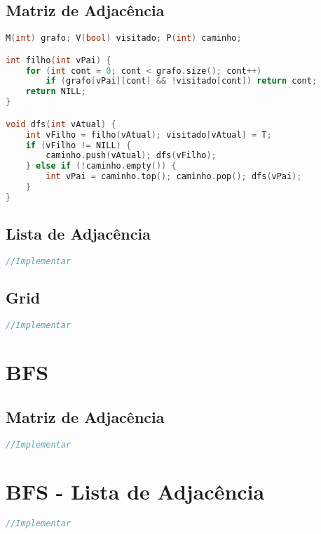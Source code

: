 \subsection*{Matriz de Adjacência}
\begin{lstlisting}[language=C++]
M(int) grafo; V(bool) visitado; P(int) caminho;

int filho(int vPai) {
	for (int cont = 0; cont < grafo.size(); cont++)
        if (grafo[vPai][cont] && !visitado[cont]) return cont;
    return NILL;
}

void dfs(int vAtual) {
    int vFilho = filho(vAtual); visitado[vAtual] = T;
    if (vFilho != NILL) {
        caminho.push(vAtual); dfs(vFilho);
    } else if (!caminho.empty()) {
        int vPai = caminho.top(); caminho.pop(); dfs(vPai);
    }
}
\end{lstlisting}

\subsection*{Lista de Adjacência}
\begin{lstlisting}[language=C++]
//Implementar
\end{lstlisting}

\subsection*{Grid}
\begin{lstlisting}[language=C++]
//Implementar
\end{lstlisting}

\newpage

\section{BFS}
\subsection*{Matriz de Adjacência}
\begin{lstlisting}[language = C++]
//Implementar
\end{lstlisting}

\section{BFS - Lista de Adjacência}
\begin{lstlisting}[language=C++]
//Implementar
\end{lstlisting}

